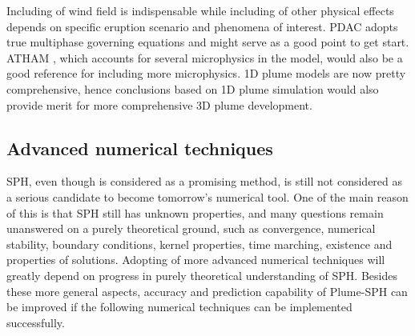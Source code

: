 Including of wind field is indispensable while including of other physical effects depends on specific eruption scenario and phenomena of interest. PDAC\citep{neri2003multiparticle} adopts true multiphase governing equations and might serve as a good point to get start. ATHAM  \citep{oberhuber1998volcanic}, which accounts for several microphysics in the model, would also be a good reference for including more microphysics. 1D plume models \citep{bursik2001effect, pouget2016sensitivity, folch2016fplume} are now pretty comprehensive, hence conclusions based on 1D plume simulation would also provide merit for more comprehensive 3D plume development.

\subsection{Advanced numerical techniques}
SPH, even though is considered as a promising method, is still not considered as a serious candidate to become tomorrow's numerical tool. One of the main reason of this is that SPH still has unknown properties, and many questions remain unanswered on a purely theoretical ground, such as convergence, numerical stability, boundary conditions, kernel properties, time marching, existence and properties of solutions.
Adopting of more advanced numerical techniques will greatly depend on progress in purely theoretical understanding of SPH. 
Besides these more general aspects, accuracy and prediction capability of Plume-SPH can be improved if the following numerical techniques can be implemented successfully. 
